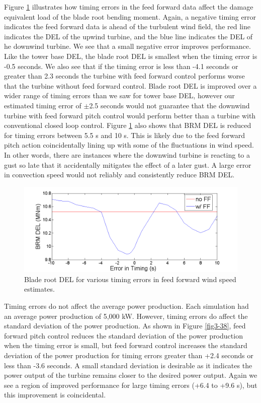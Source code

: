 Figure \ref{fig3-37} illustrates how timing errors in the feed forward data affect the damage equivalent load of the blade root bending moment. Again, a negative timing error indicates the feed forward data is ahead of the turbulent wind field, the red line indicates the DEL of the upwind turbine, and the blue line indicates the DEL of he downwind turbine. We see that a small negative error improves performance. Like the tower base DEL, the blade root DEL is smallest when the timing error is -0.5 seconds. We also see that if the timing error is less than -4.1 seconds or greater than 2.3 seconds the turbine with feed forward control performs worse that the turbine without feed forward control. Blade root DEL is improved over a wider range of timing errors than we saw for tower base DEL, however our estimated timing error of $\pm$2.5 seconds would not guarantee that the downwind turbine with feed forward pitch control would perform better than a turbine with conventional closed loop control. Figure \ref{fig3-37} also shows that BRM DEL is reduced for timing errors between 5.5 s and 10 s. This is likely due to the feed forward pitch action coincidentally lining up with some of the fluctuations in wind speed. In other words, there are instances where the downwind turbine is reacting to a gust so late that it accidentally mitigates the effect of a later gust. A large error in convection speed would not reliably and consistently reduce BRM DEL.


\begin{figure}[htb]
	\centering
		\includegraphics[width = \linewidth]{Figures/ch3Figures/fig3-37.png}
		
	\caption{Blade root DEL for various timing errors in feed forward wind speed estimates.}
	\label{fig3-37}
\end{figure}

Timing errors do not affect the average power production. Each simulation had an average power production of 5,000 kW. However, timing errors do affect the standard deviation of the power production. As shown in Figure \ref{fig3-38}, feed forward pitch control reduces the standard deviation of the power production when the timing error is small, but feed forward control increases the standard deviation of the power production for timing errors greater than +2.4 seconds or less than -3.6 seconds. A small standard deviation is desirable as it indicates the power output of the turbine remains closer to the desired power output. Again we see a region of improved performance for large timing errors (+6.4 to +9.6 s), but this improvement is coincidental. 

